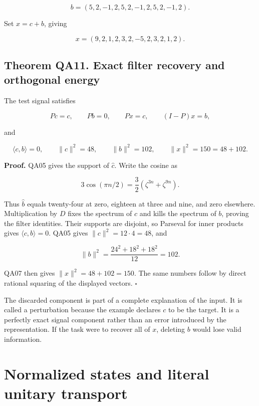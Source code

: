 \[
b=(5,2,-1,2,5,2,-1,2,5,2,-1,2).
\]

Set \(x=c+b\), giving

\[
x=(9,2,1,2,3,2,-5,2,3,2,1,2).
\]

\hypertarget{theorem-qa11.-exact-filter-recovery-and-orthogonal-energy}{%
\subsection*{Theorem QA11. Exact filter recovery and orthogonal
energy}\label{theorem-qa11.-exact-filter-recovery-and-orthogonal-energy}}

The test signal satisfies

\[
Pc=c,
\qquad Pb=0,
\qquad Px=c,
\qquad (I-P)x=b,
\]

and

\[
\langle c,b\rangle=0,
\qquad \|c\|^2=48,
\qquad \|b\|^2=102,
\qquad \|x\|^2=150=48+102.
\]

\textbf{Proof.} QA05 gives the support of \(\widehat c\). Write the
cosine as

\[
3\cos(\pi n/2)=\frac32(\zeta^{3n}+\zeta^{9n}).
\]

Thus \(\widehat b\) equals twenty-four at zero, eighteen at three and
nine, and zero elsewhere. Multiplication by \(D\) fixes the spectrum of
\(c\) and kills the spectrum of \(b\), proving the filter identities.
Their supports are disjoint, so Parseval for inner products gives
\(\langle c,b\rangle=0\). QA05 gives \(\|c\|^2=12\cdot4=48\), and

\[
\|b\|^2=\frac{24^2+18^2+18^2}{12}=102.
\]

QA07 then gives \(\|x\|^2=48+102=150\). The same numbers follow by
direct rational squaring of the displayed vectors. \(\square\)

The discarded component is part of a complete explanation of the input.
It is called a perturbation because the example declares \(c\) to be the
target. It is a perfectly exact signal component rather than an error
introduced by the representation. If the task were to recover all of
\(x\), deleting \(b\) would lose valid information.

\hypertarget{normalized-states-and-literal-unitary-transport}{%
\section{Normalized states and literal unitary
transport}\label{normalized-states-and-literal-unitary-transport}}

